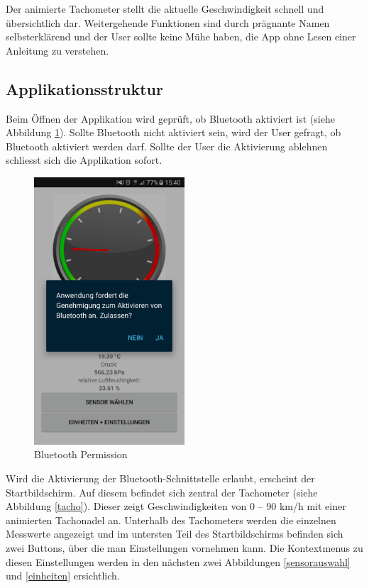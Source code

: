 Der animierte Tachometer stellt die aktuelle Geschwindigkeit schnell und übersichtlich dar. Weitergehende Funktionen sind durch prägnante Namen selbsterklärend und der User sollte keine Mühe haben, die App ohne Lesen einer Anleitung zu verstehen.

\subsection{Applikationsstruktur}

Beim Öffnen der Applikation wird geprüft, ob Bluetooth aktiviert ist (siehe Abbildung \ref{permission}). Sollte Bluetooth nicht aktiviert sein, wird der User gefragt, ob Bluetooth aktiviert werden darf. Sollte der User die Aktivierung ablehnen schliesst sich die Applikation sofort.

\begin{figure}[ht]
    \includegraphics[width=0.5\textwidth]{4Resultate/imag/BLEBluetoothPermission.png} 
    \caption{Bluetooth Permission}
    \label{permission}
\end{figure}

Wird die Aktivierung der Bluetooth-Schnittstelle erlaubt, erscheint der Startbildschirm. Auf diesem befindet sich zentral der Tachometer (siehe Abbildung \ref{tacho}). Dieser zeigt Geschwindigkeiten von 0 – 90 km/h mit einer animierten Tachonadel an. Unterhalb des Tachometers werden die einzelnen Messwerte angezeigt und im untersten Teil des Startbildschirms befinden sich zwei Buttons, über die man Einstellungen vornehmen kann. Die Kontextmenus zu diesen Einstellungen werden in den nächsten zwei Abbildungen \ref{sensorauswahl} und \ref{einheiten} ersichtlich. 

